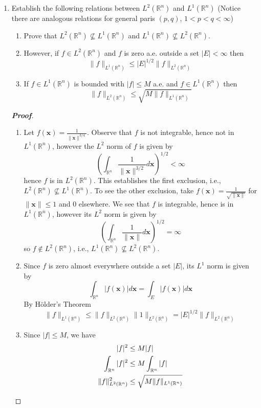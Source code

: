 \documentclass[12pt,leqno]{book}
\theoremstyle{definition}
\newcommand{\R}{\mathbb{R}}
\newenvironment{Proof}{\begin{proof}[\textnormal{\textbf{Proof}}]}{\end{proof}}
\begin{document}
\begin{enumerate}
\begin{Proof}
\end{Proof}

 \item Establish the following relations between $L^2(\R^n)$ and $L^1(\R^n)$ (Notice there are analogous relations for general paris $(p,q)$, $1<p<q<\infty$)
      \begin{enumerate}
       \item Prove that $L^2(\R^n)\not\subseteq L^1(\R^n)$ and $L^1(\R^n)\not\subseteq L^2(\R^n)$.
       \item However, if $f\in L^2(\R^n)$ and $f$ is zero a.e. outside a set $|E|<\infty$ then \[\|f\|_{L^1(\R^n)}\leq|E|^{1/2}\|f\|_{L^2(\R^n)}\] 
       \item If $f\in L^1(\R^n)$ is bounded with $|f|\leq M$ a.e. and $f\in L^1(\R^n)$ then \[\|f\|_{L^2(\R^n)}\leq\sqrt{M\|f\|_{L^1(\R^n)}}\]
      \end{enumerate}

\begin{Proof}\indent
 \begin{enumerate}
  \item Let $f(\mathbf{x})=\frac{1}{\|\mathbf{x}\|^{3/4}}$. Observe that $f$ is not integrable, hence not in $L^1(\R^n)$, however the $L^2$ norm of $f$ is given by \[\left(\int_{\R^n}\frac{1}{\|\mathbf{x}\|^{3/2}}d\mathbf{x}\right)^{1/2}<\infty\] hence $f$ is in $L^2(\R^n)$. This establishes the first exclusion, i.e., $L^2(\R^n)\not\subseteq L^1(\R^n)$. To see the other exclusion, take $f(\mathbf{x})=\frac{1}{\sqrt{\|\mathbf{x}\|}}$ for $\|\mathbf{x}\|\leq1$ and 0 elsewhere. We see that $f$ is integrable, hence is in $L^1(\R^n)$, however its $L^2$ norm is given by \[\left(\int_{\R^n}\frac{1}{\|\mathbf{x}\|}d\mathbf{x}\right)^{1/2}=\infty\] so $f\notin L^2(\R^n)$, i.e., $L^1(\R^n)\not\subseteq L^2(\R^n)$.
  \item Since $f$ is zero almost everywhere outside a set $|E|$, its $L^1$ norm is given by \[\int_{\R^n}|f(\mathbf{x})|d\mathbf{x}=\int_{E}|f(\mathbf{x})|d\mathbf{x}\] By H\"{o}lder's Theorem \[\|f\|_{L^1(\R^n)}\leq\|f\|_{L^2(\R^n)}\|1\|_{L^2(\R^n)}=|E|^{1/2}\|f\|_{L^2(\R^n)}\]
  \item Since $|f|\leq M$, we have \begin{align*}|f|^2&\leq M|f|\\\int_{\R^n}|f|^2&\leq M\int_{\R^n}|f|\\\|f\|_{L^2(\R^n)}^2&\leq\sqrt{M\|f\|_{L^1(\R^n)}}\qedhere\end{align*}
 \end{enumerate}
\end{Proof}


\end{enumerate}
\end{document}
